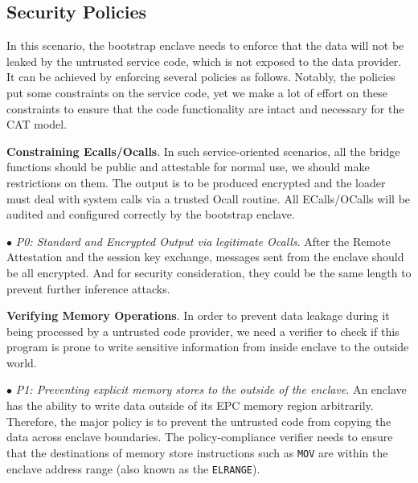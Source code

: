 {%

\subsection{Security Policies}\label{subsec-policies}

In this scenario, the bootstrap enclave needs to enforce that the data will not be leaked by the untrusted service code, which is not exposed to the data provider. It can be achieved by enforcing several policies as follows. Notably, the policies put some constraints on the service code, yet we make a lot of effort on these constraints to ensure that the code functionality are intact and necessary for the CAT model.

\vspace{3pt}\noindent\textbf {Constraining Ecalls/Ocalls}. In such service-oriented scenarios, all the bridge functions should be public and attestable for normal use, we should make restrictions on them. The output is to be produced encrypted and the loader must deal with system calls via a trusted Ocall routine. All ECalls/OCalls will be audited and configured correctly by the bootstrap enclave.  

\vspace{2pt}\noindent$\bullet$\textit{ P0: Standard and Encrypted Output via legitimate Ocalls}. After the Remote Attestation and the session key exchange, messages sent from the enclave should be all encrypted. And for security consideration, they could be the same length to prevent further inference attacks.

\vspace{3pt}\noindent\textbf {Verifying Memory Operations}. In order to prevent data leakage during it being processed by a untrusted code provider, we need a verifier to check if this program is prone to write sensitive information from inside enclave to the outside world. 

\vspace{2pt}\noindent$\bullet$\textit{ P1: Preventing explicit memory stores to the outside of the enclave}. An enclave has the ability to write data outside of its EPC memory region arbitrarily. Therefore, the major policy is to prevent the untrusted code from copying the data across enclave boundaries. The policy-compliance verifier needs to ensure that the destinations of memory store instructions such as \texttt{MOV} are within the enclave address range (also known as the \texttt{ELRANGE}). %

}
